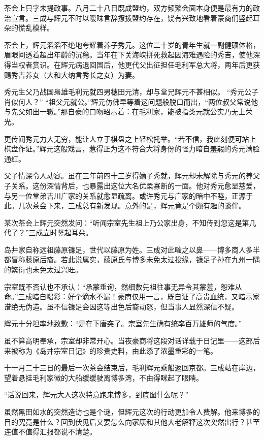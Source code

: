 \documentclass[
]{article}
\begin{document}
茶会上只字未提政事。八月二十八日既成盟约，双方频繁会面本身便是最有力的政治宣言。三成与辉元不时以暧昧言辞撩拨盟约存在，饶有兴致地看着豪商们竖起耳朵的慌乱模样。

茶会上，辉元滔滔不绝地夸耀着养子秀元。这位二十岁的青年生就一副健硕体格，眉眼间透着超出年龄的沉稳。当年在下关海峡拼死救起因海难遇险的秀吉，使他深得当权者赏识。在辉元病退回国后，他更代父出征担任毛利军总大将，两年后更获赐秀吉养女（大和大纳言秀长之女）为妻。

秀元生父乃战国枭雄毛利元就四男穗田元清，却与堂兄辉元不甚相似。
``秀元公子肖似何人？''
``祖父元就公。''辉元仿佛早等着这问题般脱口而出，``两位叔父常说他与先父如出一辙。''那自豪的口吻昭示着：在毛利家，能被指类元就公实乃无上荣光。

更传闻秀元力大无穷，能让人立于棋盘之上轻松托举。``若不信，我此刻便可站上棋盘作证。''辉元这般戏言，惹得正为这不符合大将身份的怪力暗自羞赧的秀元满脸通红。

父子情深令人动容。虽在三年前四十三岁得嫡子秀就，辉元却未解除与秀元的养父子关系。这份深情背后，也暴露出这位大名优柔寡断的一面。他对秀元愈显慈爱，与另一位堂弟吉川广家的关系就愈显疏离。或许秀元与广家的暗中不睦，正源于此。几次茶会下来，三成总有新发现。意外的是，辉元竟是个颇有趣的谈伴。

某次茶会上辉元突然发问：``听闻宗室先生祖上乃公家出身，不知传到您这是第几代了？''三成立时竖起耳朵。

岛井家自称远祖藤原镰足，世代以藤原为姓。三成对此嗤之以鼻------博多商人多半都冒称藤原后裔。若此说属实，藤原氏与博多未免太过投缘，镰足子孙在九州一隅的繁衍也未免太过兴旺。

宗室既不否认也不承认：``承蒙垂询，然细数先祖往事无异令其蒙羞，恕难从命。''三成暗自喝彩：好个滴水不漏！豪商仅用一言，既自证了高贵血统，又暗示家谱绝无伪造。虽不信镰足会因这等出色后裔动怒，但当事人显然深信不疑。

辉元十分坦率地致歉：``是在下唐突了。宗室先生确有统率百万雄师的气度。''

虽不算高明奉承，宗室却非常开心。当夜豪商将这段对话详载于日记里------这部后来被称为《岛井宗室日记》的珍贵史料，由此添了浓墨重彩的一笔。

十一月二十三日的最后一次茶会结束后，毛利辉元乘船返回京都。三成站在岸边，望着悬挂毛利家徽的大船缓缓驶离博多湾，不由得眯起了眼睛。

``话说回来，辉元大人这次特意跑来博多，到底图什么呢？''

虽然黑田如水的突然造访也是个谜，但辉元这次的行动更加令人费解。他来博多的目的究竟是什么？回到伏见后又要怎么向家康和其他大老解释这次突然出行？甚至连值不值得汇报都说不清楚。
\end{document}
